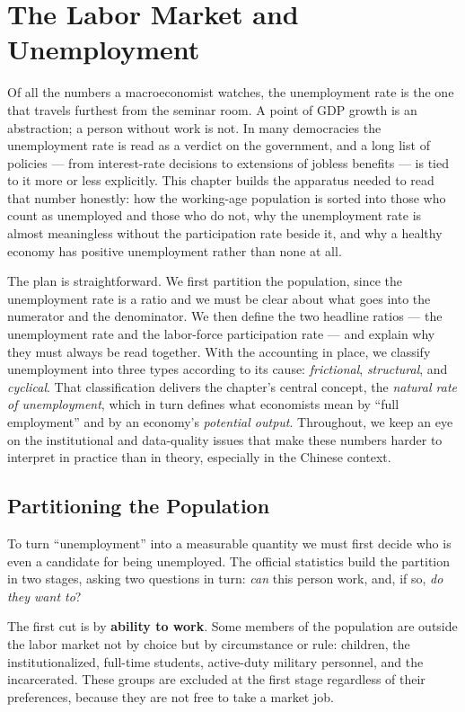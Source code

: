 \chapter{The Labor Market and Unemployment}
\label{ch:labor}

Of all the numbers a macroeconomist watches, the unemployment rate is the one that travels furthest from the seminar room. A point of GDP growth is an abstraction; a person without work is not. In many democracies the unemployment rate is read as a verdict on the government, and a long list of policies --- from interest-rate decisions to extensions of jobless benefits --- is tied to it more or less explicitly. This chapter builds the apparatus needed to read that number honestly: how the working-age population is sorted into those who count as unemployed and those who do not, why the unemployment rate is almost meaningless without the participation rate beside it, and why a healthy economy has positive unemployment rather than none at all.

The plan is straightforward. We first partition the population, since the unemployment rate is a ratio and we must be clear about what goes into the numerator and the denominator. We then define the two headline ratios --- the unemployment rate and the labor-force participation rate --- and explain why they must always be read together. With the accounting in place, we classify unemployment into three types according to its cause: \emph{frictional}, \emph{structural}, and \emph{cyclical}. That classification delivers the chapter's central concept, the \emph{natural rate of unemployment}, which in turn defines what economists mean by ``full employment'' and by an economy's \emph{potential output}. Throughout, we keep an eye on the institutional and data-quality issues that make these numbers harder to interpret in practice than in theory, especially in the Chinese context.

\section{Partitioning the Population}

To turn ``unemployment'' into a measurable quantity we must first decide who is even a candidate for being unemployed. The official statistics build the partition in two stages, asking two questions in turn: \emph{can} this person work, and, if so, \emph{do they want to}?

The first cut is by \textbf{ability to work}. Some members of the population are outside the labor market not by choice but by circumstance or rule: children, the institutionalized, full-time students, active-duty military personnel, and the incarcerated. These groups are excluded at the first stage regardless of their preferences, because they are not free to take a market job.

